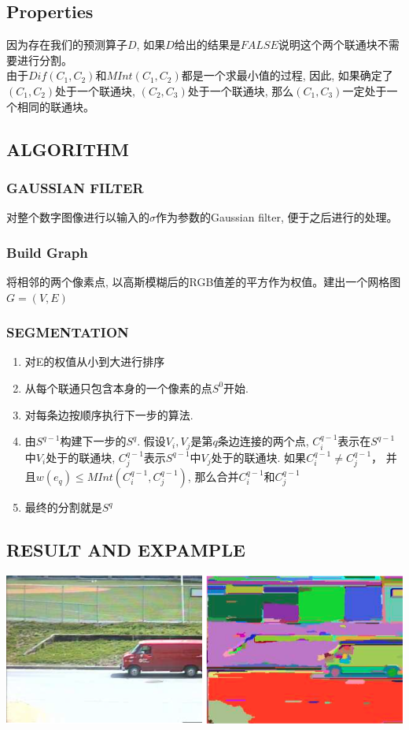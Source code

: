 \documentclass[paper=a4, fontsize=11pt]{scrartcl} %
\numberwithin{equation}{section} %
\numberwithin{figure}{section} %
\numberwithin{table}{section} %
\begin{document}
\subsection{Properties}
	
	因为存在我们的预测算子$D$, 如果$D$给出的结果是$FALSE$说明这个两个联通块不需要进行分割。\\
	由于$Dif(C_1, C_2)$和$MInt(C_1, C_2)$都是一个求最小值的过程, 因此, 如果确定了$(C_1, C_2)$处于一个联通块, $(C_2, C_3)$处于一个联通块, 那么$(C_1, C_3)$一定处于一个相同的联通块。

\subsection{ALGORITHM}

	\subsubsection{GAUSSIAN FILTER}
		对整个数字图像进行以输入的$\sigma$作为参数的Gaussian filter, 便于之后进行的处理。
	\subsubsection{Build Graph}
		将相邻的两个像素点, 以高斯模糊后的RGB值差的平方作为权值。建出一个网格图 $ G = (V, E) $
	\subsubsection{SEGMENTATION}
		\begin{enumerate}
			\item 对E的权值从小到大进行排序
			\item 从每个联通只包含本身的一个像素的点$S^0$开始.
			\item 对每条边按顺序执行下一步的算法.
			\item 由$S^{q-1}$构建下一步的$S^{q}$. 假设$V_i, V_j$是第$q$条边连接的两个点, $C_i^{q-1}$表示在$S^{q-1}$中$V_i$处于的联通块, $C_j^{q-1}$表示$S^{q-1}$中$V_j$处于的联通块.
				如果$C_i^{q-1} \neq C_j^{q-1}$， 并且$w(e_q) \leq MInt(C_i^{q-1}, C_j^{q-1})$, 那么合并$C_i^{q-1}$和$C_j^{q-1}$
			\item 最终的分割就是$S^q$
		\end{enumerate}

\subsection{RESULT AND EXPAMPLE}
\setlength{\parindent}{0em}
	\includegraphics[scale=0.5]{pic1.png}
\end{document}
